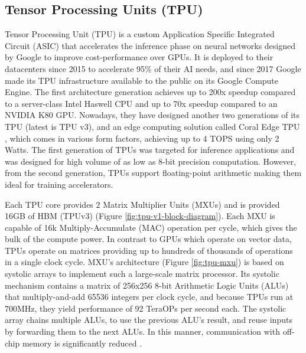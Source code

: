 \subsection{Tensor Processing Units (TPU)}
Tensor Processing Unit (TPU) \cite{In-Datacenter-Performance-Analysis-of-a-Tensor-Processing-Unit} is a custom Application Specific Integrated Circuit (ASIC) that accelerates the inference phase on neural networks designed by Google to improve cost-performance over GPUs. It is deployed to their datacenters since 2015 to accelerate 95\% of their AI needs, and since 2017 Google made its TPU infrastructure available to the public on its Google Compute Engine. The first architecture generation achieves up to 200x speedup compared to a server-class Intel Haswell CPU and up to 70x speedup compared to an NVIDIA K80 GPU. Nowadays, they have designed another two generations of its TPU (latest is TPU v3), and an edge computing solution called Coral Edge TPU \cite{Coral-Edge-TPU}, which comes in various form factors, achieving up to 4 TOPS using only 2 Watts. The first generation of TPUs was targeted for inference applications and was designed for high volume of as low as 8-bit precision computation. However, from the second generation, TPUs support floating-point arithmetic making them ideal for training accelerators.

Each TPU core provides 2 Matrix Multiplier Units (MXUs) and is provided 16GB of HBM (TPUv3) (Figure \ref{fig:tpu-v1-block-diagram}). Each MXU is capable of 16k Multiply-Accumulate (MAC) operation per cycle, which gives the bulk of the compute power. In contrast to GPUs which operate on vector data, TPUs operate on matrices providing up to hundreds of thousands of operations in a single clock cycle. MXU's architecture (Figure \ref{fig:tpu-mxu}) is based on systolic arrays to implement such a large-scale matrix processor. Its systolic mechanism contains a matrix of 256x256 8-bit Arithmetic Logic Units (ALUs) that multiply-and-add 65536 integers per clock cycle, and because TPUs run at 700MHz, they yield performance of 92 TeraOPs per second each. The systolic array chains multiple ALUs, to use the previous ALU's result, and reuse inputs by forwarding them to the next ALUs. In this manner, communication with off-chip memory is significantly reduced \cite{An-in-depth-look-at-Google-first-TPU}.

